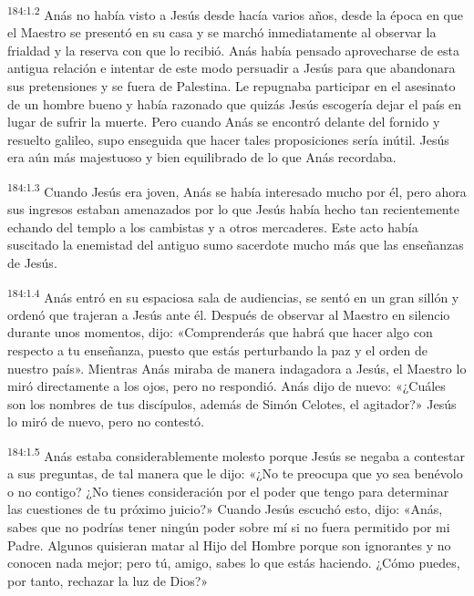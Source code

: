 \par 
\textsuperscript{184:1.2} Anás no había visto a Jesús desde hacía varios años, desde la época en que el Maestro se presentó en su casa y se marchó inmediatamente al observar la frialdad y la reserva con que lo recibió. Anás había pensado aprovecharse de esta antigua relación e intentar de este modo persuadir a Jesús para que abandonara sus pretensiones y se fuera de Palestina. Le repugnaba participar en el asesinato de un hombre bueno y había razonado que quizás Jesús escogería dejar el país en lugar de sufrir la muerte. Pero cuando Anás se encontró delante del fornido y resuelto galileo, supo enseguida que hacer tales proposiciones sería inútil. Jesús era aún más majestuoso y bien equilibrado de lo que Anás recordaba.

\par 
\textsuperscript{184:1.3} Cuando Jesús era joven, Anás se había interesado mucho por él, pero ahora sus ingresos estaban amenazados por lo que Jesús había hecho tan recientemente echando del templo a los cambistas y a otros mercaderes. Este acto había suscitado la enemistad del antiguo sumo sacerdote mucho más que las enseñanzas de Jesús.

\par 
\textsuperscript{184:1.4} Anás entró en su espaciosa sala de audiencias, se sentó en un gran sillón y ordenó que trajeran a Jesús ante él. Después de observar al Maestro en silencio durante unos momentos, dijo: «Comprenderás que habrá que hacer algo con respecto a tu enseñanza, puesto que estás perturbando la paz y el orden de nuestro país». Mientras Anás miraba de manera indagadora a Jesús, el Maestro lo miró directamente a los ojos, pero no respondió. Anás dijo de nuevo: «¿Cuáles son los nombres de tus discípulos, además de Simón Celotes, el agitador?» Jesús lo miró de nuevo, pero no contestó.

\par 
\textsuperscript{184:1.5} Anás estaba considerablemente molesto porque Jesús se negaba a contestar a sus preguntas, de tal manera que le dijo: «¿No te preocupa que yo sea benévolo o no contigo? ¿No tienes consideración por el poder que tengo para determinar las cuestiones de tu próximo juicio?» Cuando Jesús escuchó esto, dijo: «Anás, sabes que no podrías tener ningún poder sobre mí si no fuera permitido por mi Padre. Algunos quisieran matar al Hijo del Hombre porque son ignorantes y no conocen nada mejor; pero tú, amigo, sabes lo que estás haciendo. ¿Cómo puedes, por tanto, rechazar la luz de Dios?»

